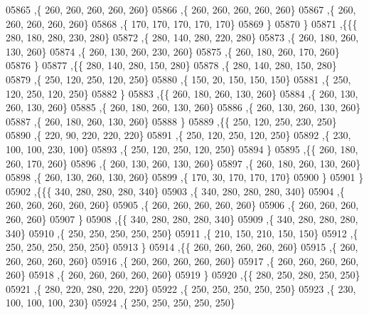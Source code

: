 \begin{DoxyCode}
05865     ,\{   260,   260,   260,   260,   260\}
05866     ,\{   260,   260,   260,   260,   260\}
05867     ,\{   260,   260,   260,   260,   260\}
05868     ,\{   170,   170,   170,   170,   170\}
05869     \}
05870    \}
05871   ,\{\{\{   280,   180,   280,   230,   280\}
05872     ,\{   280,   140,   280,   220,   280\}
05873     ,\{   260,   180,   260,   130,   260\}
05874     ,\{   260,   130,   260,   230,   260\}
05875     ,\{   260,   180,   260,   170,   260\}
05876     \}
05877    ,\{\{   280,   140,   280,   150,   280\}
05878     ,\{   280,   140,   280,   150,   280\}
05879     ,\{   250,   120,   250,   120,   250\}
05880     ,\{   150,    20,   150,   150,   150\}
05881     ,\{   250,   120,   250,   120,   250\}
05882     \}
05883    ,\{\{   260,   180,   260,   130,   260\}
05884     ,\{   260,   130,   260,   130,   260\}
05885     ,\{   260,   180,   260,   130,   260\}
05886     ,\{   260,   130,   260,   130,   260\}
05887     ,\{   260,   180,   260,   130,   260\}
05888     \}
05889    ,\{\{   250,   120,   250,   230,   250\}
05890     ,\{   220,    90,   220,   220,   220\}
05891     ,\{   250,   120,   250,   120,   250\}
05892     ,\{   230,   100,   100,   230,   100\}
05893     ,\{   250,   120,   250,   120,   250\}
05894     \}
05895    ,\{\{   260,   180,   260,   170,   260\}
05896     ,\{   260,   130,   260,   130,   260\}
05897     ,\{   260,   180,   260,   130,   260\}
05898     ,\{   260,   130,   260,   130,   260\}
05899     ,\{   170,    30,   170,   170,   170\}
05900     \}
05901    \}
05902   ,\{\{\{   340,   280,   280,   280,   340\}
05903     ,\{   340,   280,   280,   280,   340\}
05904     ,\{   260,   260,   260,   260,   260\}
05905     ,\{   260,   260,   260,   260,   260\}
05906     ,\{   260,   260,   260,   260,   260\}
05907     \}
05908    ,\{\{   340,   280,   280,   280,   340\}
05909     ,\{   340,   280,   280,   280,   340\}
05910     ,\{   250,   250,   250,   250,   250\}
05911     ,\{   210,   150,   210,   150,   150\}
05912     ,\{   250,   250,   250,   250,   250\}
05913     \}
05914    ,\{\{   260,   260,   260,   260,   260\}
05915     ,\{   260,   260,   260,   260,   260\}
05916     ,\{   260,   260,   260,   260,   260\}
05917     ,\{   260,   260,   260,   260,   260\}
05918     ,\{   260,   260,   260,   260,   260\}
05919     \}
05920    ,\{\{   280,   250,   280,   250,   250\}
05921     ,\{   280,   220,   280,   220,   220\}
05922     ,\{   250,   250,   250,   250,   250\}
05923     ,\{   230,   100,   100,   100,   230\}
05924     ,\{   250,   250,   250,   250,   250\}

\end{DoxyCode}
